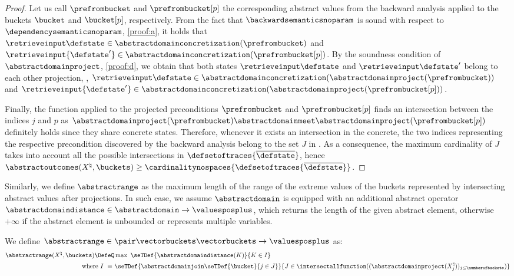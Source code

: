 \begin{proof}
  Let us call $\prefrombucket$ and $\prefrombucket[p]$ the corresponding abstract values from the backward analysis applied to the buckets $\bucket$ and $\bucket[p]$, respectively.
  From the fact that $\backwardsemanticsnoparam$ is sound with respect to $\dependencysemanticsnoparam$, \cf{} \ref{proof:a}, it holds that $\retrieveinput\defstate \in \abstractdomainconcretization(\prefrombucket)$ and $\retrieveinput{\defstate'} \in \abstractdomainconcretization(\prefrombucket[p])$.
  By the soundness condition of $\abstractdomainproject$, \cf{} \ref{proof:d}, we obtain that both states $\retrieveinput\defstate$ and $\retrieveinput\defstate'$ belong to each other projection, \ie, $\retrieveinput\defstate \in \abstractdomainconcretization(\abstractdomainproject(\prefrombucket))$ and $\retrieveinput{\defstate'} \in \abstractdomainconcretization(\abstractdomainproject(\prefrombucket[p]))$.

  Finally, the function \intersectallfunction{} applied to the projected preconditions $\prefrombucket$ and $\prefrombucket[p]$ finds an intersection between the indices $j$ and $p$ as $\abstractdomainproject(\prefrombucket) \abstractdomainmeet \abstractdomainproject(\prefrombucket[p])$ definitely holds since they share concrete states. Therefore, whenever it exists an intersection in the concrete, the two indices representing the respective precondition discovered by the backward analysis belong to the set $J$ in .
  As a consequence, the maximum cardinality of $J$ takes into account all the possible intersections in $\defsetoftraces{\overline\defstate}$, hence $\abstractoutcomes(X^\natural, \buckets) \ge \cardinalitynospaces{\defsetoftraces{\overline\defstate}}$.
\end{proof}

Similarly, we define $\abstractrange$ as the maximum length of the range of the extreme values of the buckets represented by intersecting abstract values after projections.
In such case, we assume $\abstractdomain$ is equipped with an additional abstract operator $\abstractdomaindistance\in\abstractdomain\to\valuesposplus$, which returns the length of the given abstract element, otherwise $+\infty$ if the abstract element is unbounded or represents multiple variables.

\begin{definition}
  We define $\abstractrange\in\pair\vectorbuckets\vectorbuckets\to\valuesposplus$ as:
  \begin{align*}
    \abstractrange(X^\natural, \buckets) \DefeQ& \max~\seTDef{\abstractdomaindistance(K)}{K \in I} \\
    \text{where}~
    I ~=~& \seTDef{\abstractdomainjoin\seTDef{\bucket}{j\in J}}{J \in \intersectallfunction((\abstractdomainproject(X^\natural_j))_{j\le\numberofbuckets})}
  \end{align*}
\end{definition}

